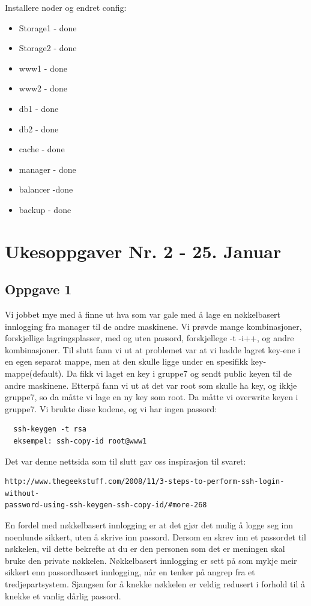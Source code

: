 \documentclass[a4paper, norsk, 12pt]{article}
\begin{document}
Installere noder og endret config:
\begin{itemize}
\item Storage1 - done
\item Storage2 - done
\item www1 - done
\item www2 - done
\item db1 - done
\item db2 - done
\item cache - done
\item manager - done
\item balancer -done
\item backup - done
\end{itemize}

\section{Ukesoppgaver Nr. 2 - 25. Januar}
\subsection{Oppgave 1}
Vi jobbet mye med å finne ut hva som var gale med å lage en nøkkelbasert innlogging fra manager til de andre maskinene. Vi prøvde mange kombinasjoner, forskjellige lagringsplasser, med og uten passord, forskjellege -t -i++, og andre kombinasjoner. Til slutt fann vi ut at problemet var at vi hadde lagret key-ene i en egen separat mappe, men at den skulle ligge under en spesifikk key-mappe(default). Da fikk vi laget en key i gruppe7 og sendt public keyen til de andre maskinene. Etterpå fann vi ut at det var root som skulle ha key, og ikkje gruppe7, so da måtte vi lage en ny key som root. Da måtte  vi overwrite keyen i gruppe7. Vi brukte disse kodene, og vi har ingen passord:\\
\begin{verbatim}
  ssh-keygen -t rsa
  eksempel: ssh-copy-id root@www1
\end{verbatim}
Det var denne nettsida som til slutt gav oss inspirasjon til svaret:\\
\begin{verbatim}
http://www.thegeekstuff.com/2008/11/3-steps-to-perform-ssh-login-without-
password-using-ssh-keygen-ssh-copy-id/#more-268
\end{verbatim}

En fordel med nøkkelbasert innlogging er at det gjør det mulig å logge seg inn noenlunde sikkert, uten å skrive inn passord. Dersom en skrev inn et passordet til nøkkelen, vil dette bekrefte at du er den personen som det er meningen skal bruke den private nøkkelen. Nøkkelbasert innlogging er sett på som mykje meir sikkert enn passordbasert innlogging, når en tenker på angrep fra et tredjepartsystem. Sjangsen for å knekke nøkkelen er veldig redusert i forhold til å knekke et vanlig dårlig passord.\\
\end{document}
